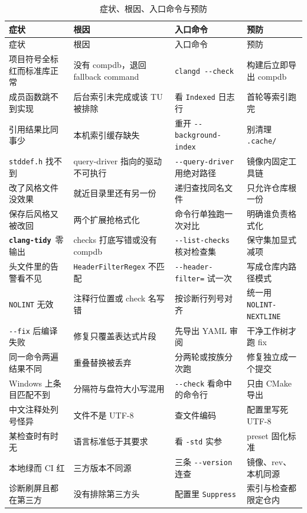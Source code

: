 \documentclass[12pt,a4paper,fontset=fandol]{ctexbook}
\newcommand{\Opt}[1]{\texttt{-\/-#1}}
\newcommand{\Lib}[1]{\textbf{\texttt{#1}}}
\newcommand{\Tidy}{\Lib{clang-tidy}}
\begin{document}
{\footnotesize
\begin{longtable}{@{}>{\raggedright\arraybackslash}p{}
                  >{\raggedright\arraybackslash}p{}
                  >{\raggedright\arraybackslash}p{}
                  >{\raggedright\arraybackslash}p{}@{}}
\caption{症状、根因、入口命令与预防}\label{tab:ch17-all}\\
\toprule
症状 & 根因 & 入口命令 & 预防 \\
\midrule
\endfirsthead
\toprule
症状 & 根因 & 入口命令 & 预防 \\
\midrule
\endhead
\bottomrule
\endlastfoot
项目符号全标红而标准库正常 & 没有 compdb，退回 fallback command & \texttt{clangd}~\Opt{check} & 构建后立即导出 compdb \\
成员函数跳不到实现 & 后台索引未完成或该 TU 被排除 & 看 \texttt{Indexed} 日志行 & 首轮等索引跑完 \\
引用结果比同事少 & 本机索引缓存缺失 & 重开 \Opt{background-\allowbreak index} & 别清理 \texttt{.cache/} \\
\texttt{stddef.h} 找不到 & query-driver 指向的驱动不可执行 & \Opt{query-driver} 用绝对路径 & 镜像内固定工具链 \\
改了风格文件没效果 & 就近目录里还有另一份 & 递归查找同名文件 & 只允许仓库根一份 \\
保存后风格又被改回 & 两个扩展抢格式化 & 命令行单独跑一次对比 & 明确谁负责格式化 \\
\Tidy\ 零输出 & checks 打底写错或没有 compdb & \Opt{list-checks} 核对检查集 & 保守集加显式减项 \\
头文件里的告警看不见 & \texttt{HeaderFilterRegex} 不匹配 & \Opt{header-filter=} 试一次 & 写成仓库内路径模式 \\
\texttt{NOLINT} 无效 & 注释行位置或 check 名写错 & 按诊断行列号对齐 & 统一用 \texttt{NOLINT-\allowbreak NEXTLINE} \\
\Opt{fix} 后编译失败 & 修复只覆盖表达式片段 & 先导出 YAML 审阅 & 干净工作树才跑 fix \\
同一命令两遍结果不同 & 重叠替换被丢弃 & 分两轮或按族分次跑 & 修复独立成一个提交 \\
Windows 上条目匹配不到 & 分隔符与盘符大小写混用 & \Opt{check} 看命中的命令行 & 只由 CMake 导出 \\
中文注释处列号怪异 & 文件不是 UTF-8 & 查文件编码 & 配置里写死 UTF-8 \\
某检查时有时无 & 语言标准低于其要求 & 看 \texttt{-std} 实参 & preset 固化标准 \\
本地绿而 CI 红 & 三方版本不同源 & 三条 \Opt{version} 连查 & 镜像、rev、本机同源 \\
诊断刷屏且都在第三方 & 没有排除第三方头 & 配置里 \texttt{Suppress} & 索引与检查都限定仓内 \\
\end{longtable}
}
\end{document}

